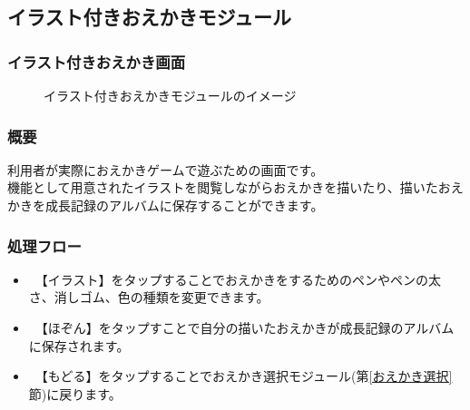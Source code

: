 \documentclass[a4j]{jarticle}
\begin{document}
\newpage
\subsection{イラスト付きおえかきモジュール}
\subsubsection{イラスト付きおえかき画面\label{イラスト}}
\begin{figure}[H]
    \begin{center}
    \caption {イラスト付きおえかきモジュールのイメージ}
    \label{functionselection}
    \end{center}
\end{figure}

\subsubsection*{概要}
利用者が実際におえかきゲームで遊ぶための画面です。\\
機能として用意されたイラストを閲覧しながらおえかきを描いたり、描いたおえかきを成長記録のアルバムに保存することができます。

\subsubsection*{処理フロー}
\begin{itemize}
\item　【イラスト】をタップすることでおえかきをするためのペンやペンの太さ、消しゴム、色の種類を変更できます。
\item　【ほぞん】をタップすことで自分の描いたおえかきが成長記録のアルバムに保存されます。
\item　【もどる】をタップすることでおえかき選択モジュール(第\ref{おえかき選択}節)に戻ります。
\end{itemize}
\end{document}
